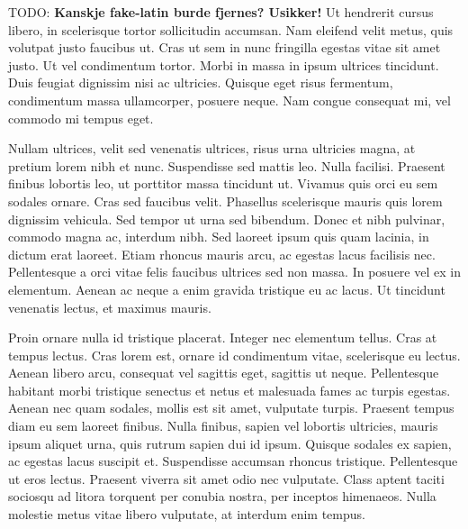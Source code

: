 \documentclass[aps,pre,twocolumn,letterpaper,floatfix,showpacs]{revtex4}
\newcommand{\todo}[1]{ {\color{Magenta} TODO: \color{Blue} \textbf{#1} }}
\begin{document}
\todo{Kanskje fake-latin burde fjernes? Usikker!}
Ut hendrerit cursus libero, in scelerisque tortor sollicitudin accumsan. Nam eleifend velit metus, quis volutpat justo faucibus ut. Cras ut sem in nunc fringilla egestas vitae sit amet justo. Ut vel condimentum tortor. Morbi in massa in ipsum ultrices tincidunt. Duis feugiat dignissim nisi ac ultricies. Quisque eget risus fermentum, condimentum massa ullamcorper, posuere neque. Nam congue consequat mi, vel commodo mi tempus eget.

Nullam ultrices, velit sed venenatis ultrices, risus urna ultricies magna, at pretium lorem nibh et nunc. Suspendisse sed mattis leo. Nulla facilisi. Praesent finibus lobortis leo, ut porttitor massa tincidunt ut. Vivamus quis orci eu sem sodales ornare. Cras sed faucibus velit. Phasellus scelerisque mauris quis lorem dignissim vehicula. Sed tempor ut urna sed bibendum. Donec et nibh pulvinar, commodo magna ac, interdum nibh. Sed laoreet ipsum quis quam lacinia, in dictum erat laoreet. Etiam rhoncus mauris arcu, ac egestas lacus facilisis nec. Pellentesque a orci vitae felis faucibus ultrices sed non massa. In posuere vel ex in elementum. Aenean ac neque a enim gravida tristique eu ac lacus. Ut tincidunt venenatis lectus, et maximus mauris.

Proin ornare nulla id tristique placerat. Integer nec elementum tellus. Cras at tempus lectus. Cras lorem est, ornare id condimentum vitae, scelerisque eu lectus. Aenean libero arcu, consequat vel sagittis eget, sagittis ut neque. Pellentesque habitant morbi tristique senectus et netus et malesuada fames ac turpis egestas. Aenean nec quam sodales, mollis est sit amet, vulputate turpis. Praesent tempus diam eu sem laoreet finibus. Nulla finibus, sapien vel lobortis ultricies, mauris ipsum aliquet urna, quis rutrum sapien dui id ipsum. Quisque sodales ex sapien, ac egestas lacus suscipit et. Suspendisse accumsan rhoncus tristique. Pellentesque ut eros lectus. Praesent viverra sit amet odio nec vulputate. Class aptent taciti sociosqu ad litora torquent per conubia nostra, per inceptos himenaeos. Nulla molestie metus vitae libero vulputate, at interdum enim tempus.







\end{document}
